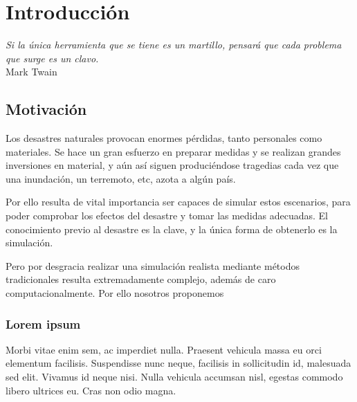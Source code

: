 
\chapter*{Introducción} \label{cap0}


\begin{flushright}
\begin{minipage}{7.85cm}
    {\em Si la única herramienta que se tiene es un martillo, pensará que cada
    problema que surge es un clavo.} \\  Mark Twain
\end{minipage}
\end{flushright}

\vspace*{5mm}

\section*{Motivación}

Los desastres naturales provocan enormes pérdidas, tanto personales como
materiales. Se hace un gran esfuerzo en preparar medidas y se realizan grandes
inversiones en material, y aún así siguen produciéndose tragedias cada vez que
una inundación, un terremoto, etc, azota a algún país.

Por ello resulta de vital importancia ser capaces de simular estos escenarios,
para poder comprobar los efectos del desastre y tomar las medidas adecuadas. El
conocimiento previo al desastre es la clave, y la única forma de obtenerlo es
la simulación.

Pero por desgracia realizar una simulación realista mediante métodos
tradicionales resulta extremadamente complejo, además de caro
computacionalmente. Por ello nosotros proponemos 

\subsection*{Lorem ipsum}

Morbi vitae enim sem, ac imperdiet nulla. Praesent vehicula massa eu orci
elementum facilisis. Suspendisse nunc neque, facilisis in sollicitudin id,
malesuada sed elit. Vivamus id neque nisi. Nulla vehicula accumsan nisl, egestas
commodo libero ultrices eu. Cras non odio magna.

